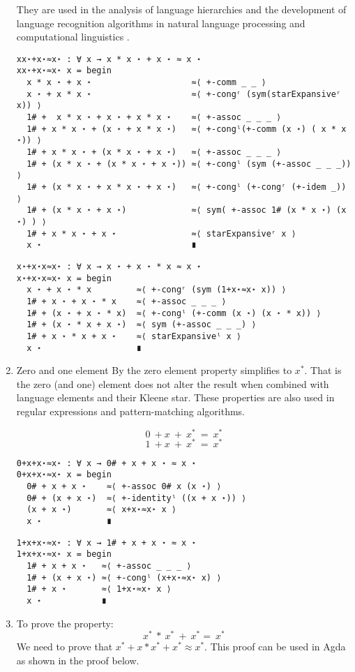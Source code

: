 \begin{enumerate}
They are used in the analysis of language hierarchies and the development of
language recognition algorithms in natural language processing and computational
linguistics \cite{desharnais2004modal}.

\begin{verbatim}
xx⋆+x⋆≈x⋆ : ∀ x → x * x ⋆ + x ⋆ ≈ x ⋆
xx⋆+x⋆≈x⋆ x = begin
  x * x ⋆ + x ⋆                    ≈⟨ +-comm _ _ ⟩ 
  x ⋆ + x * x ⋆                    ≈⟨ +-congʳ (sym(starExpansiveʳ x)) ⟩
  1# +  x * x ⋆ + x ⋆ + x * x ⋆    ≈⟨ +-assoc _ _ _ ⟩ 
  1# + x * x ⋆ + (x ⋆ + x * x ⋆)   ≈⟨ +-congˡ(+-comm (x ⋆) ( x * x ⋆)) ⟩
  1# + x * x ⋆ + (x * x ⋆ + x ⋆)   ≈⟨ +-assoc _ _ _ ⟩ 
  1# + (x * x ⋆ + (x * x ⋆ + x ⋆)) ≈⟨ +-congˡ (sym (+-assoc _ _ _)) ⟩ 
  1# + (x * x ⋆ + x * x ⋆ + x ⋆)   ≈⟨ +-congˡ (+-congʳ (+-idem _)) ⟩ 
  1# + (x * x ⋆ + x ⋆)             ≈⟨ sym( +-assoc 1# (x * x ⋆) (x ⋆) ) ⟩ 
  1# + x * x ⋆ + x ⋆               ≈⟨ starExpansiveʳ x ⟩ 
  x ⋆                              ∎
\end{verbatim}

\begin{verbatim}
x⋆+x⋆x≈x⋆ : ∀ x → x ⋆ + x ⋆ * x ≈ x ⋆
x⋆+x⋆x≈x⋆ x = begin
  x ⋆ + x ⋆ * x         ≈⟨ +-congʳ (sym (1+x⋆≈x⋆ x)) ⟩
  1# + x ⋆ + x ⋆ * x    ≈⟨ +-assoc _ _ _ ⟩
  1# + (x ⋆ + x ⋆ * x)  ≈⟨ +-congˡ (+-comm (x ⋆) (x ⋆ * x)) ⟩  
  1# + (x ⋆ * x + x ⋆)  ≈⟨ sym (+-assoc _ _ _) ⟩
  1# + x ⋆ * x + x ⋆    ≈⟨ starExpansiveˡ x ⟩ 
  x ⋆                   ∎
\end{verbatim}
\item
Zero and one element By the zero element property simplifies to $x^{*}$. That is
the zero (and one) element does not alter the result when combined with language
elements and their Kleene star. These properties are also used in regular
expressions and pattern-matching algorithms.

\[0\ + x\ +\ x^{*}\ =\ x^{*}\]
\[1\ + x\ +\ x^{*}\ =\ x^{*} \]

\begin{verbatim}
0+x+x⋆≈x⋆ : ∀ x → 0# + x + x ⋆ ≈ x ⋆
0+x+x⋆≈x⋆ x = begin
  0# + x + x ⋆    ≈⟨ +-assoc 0# x (x ⋆) ⟩
  0# + (x + x ⋆)  ≈⟨ +-identityˡ ((x + x ⋆)) ⟩
  (x + x ⋆)       ≈⟨ x+x⋆≈x⋆ x ⟩
  x ⋆             ∎

\end{verbatim}
\begin{verbatim}
1+x+x⋆≈x⋆ : ∀ x → 1# + x + x ⋆ ≈ x ⋆
1+x+x⋆≈x⋆ x = begin
  1# + x + x ⋆   ≈⟨ +-assoc _ _ _ ⟩ 
  1# + (x + x ⋆) ≈⟨ +-congˡ (x+x⋆≈x⋆ x) ⟩ 
  1# + x ⋆       ≈⟨ 1+x⋆≈x⋆ x ⟩ 
  x ⋆            ∎
\end{verbatim}
\item
To prove the property: \[x^{*}\ *\ x^{*}\ +\ x^{*} =\ x^{*}\] We need to prove that $x^{*} + x *
x^{*} + x^{*} ≈ x^{*}$. This proof can be used in Agda as shown in the proof
below.


\end{enumerate}
